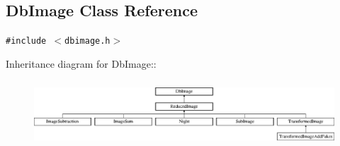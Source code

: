 \subsection{Db\-Image  Class Reference}
\label{class_dbimage}
{\tt \#include $<$dbimage.h$>$}

Inheritance diagram for Db\-Image::\begin{figure}[H]
\begin{center}
\leavevmode
\includegraphics[height=2.47514cm]{class_dbimage}
\end{center}
\end{figure}
